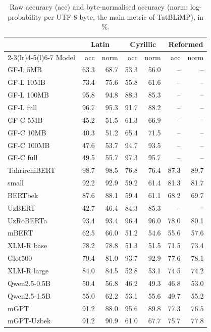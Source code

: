 \begin{table}[t]
\centering\small
\setlength{\tabcolsep}{3.5pt}
\begin{tabular}{@{}lrrrrrr@{}}
\toprule
 & \multicolumn{2}{c}{Latin} & \multicolumn{2}{c}{Cyrillic} & \multicolumn{2}{c}{Reformed} \\
\cmidrule(lr){2-3}\cmidrule(lr){4-5}\cmidrule(l){6-7}
Model & acc & norm & acc & norm & acc & norm \\
\midrule
GF-L 5MB & 63.3 & 68.7 & 53.3 & 56.0 & -- & -- \\
GF-L 10MB & 73.4 & 75.6 & 55.8 & 61.6 & -- & -- \\
GF-L 100MB & 95.8 & 94.8 & 88.3 & 85.3 & -- & -- \\
GF-L full & 96.7 & 95.3 & 91.7 & 88.2 & -- & -- \\
GF-C 5MB & 45.2 & 51.5 & 61.3 & 66.9 & -- & -- \\
GF-C 10MB & 40.3 & 51.2 & 65.4 & 71.5 & -- & -- \\
GF-C 100MB & 47.6 & 53.7 & 94.7 & 93.5 & -- & -- \\
GF-C full & 49.5 & 55.7 & 97.3 & 95.7 & -- & -- \\
TahrirchiBERT & 98.7 & 98.5 & 76.8 & 76.4 & 87.3 & 89.7 \\
\quad small & 92.2 & 92.9 & 59.2 & 61.4 & 81.3 & 81.7 \\
BERTbek & 87.6 & 88.1 & 59.4 & 61.1 & 68.2 & 69.7 \\
UzBERT & 42.7 & 46.4 & 84.3 & 85.3 & -- & -- \\
UzRoBERTa & 93.4 & 93.4 & 96.4 & 96.0 & 78.0 & 80.1 \\
mBERT & 62.5 & 66.0 & 51.2 & 54.6 & 55.6 & 57.6 \\
XLM-R base & 78.2 & 78.8 & 51.3 & 51.5 & 71.5 & 73.4 \\
Glot500 & 79.4 & 81.0 & 93.7 & 92.9 & 77.6 & 78.1 \\
XLM-R large & 84.0 & 84.5 & 52.8 & 53.1 & 74.5 & 74.2 \\
Qwen2.5-0.5B & 50.4 & 56.8 & 46.2 & 49.3 & 46.8 & 53.0 \\
Qwen2.5-1.5B & 55.0 & 62.2 & 53.1 & 55.6 & 49.7 & 55.2 \\
mGPT & 91.2 & 88.0 & 95.6 & 89.8 & 77.3 & 76.5 \\
mGPT-Uzbek & 91.2 & 90.9 & 61.0 & 67.7 & 75.7 & 77.8 \\
\bottomrule
\end{tabular}
\caption{Raw accuracy (acc) and byte-normalised accuracy (norm; log-probability per UTF-8 byte, the main metric of TatBLiMP), in \%.}
\label{tab:accnorm}
\end{table}
